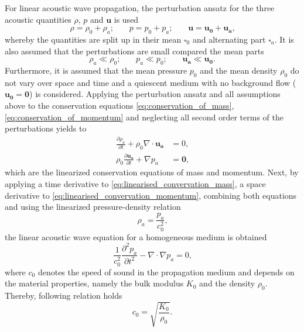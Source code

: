 For linear acoustic wave propagation, the perturbation ansatz for the three acoustic quantities $\rho$, $p$ and $\boldsymbol{u}$ is used
\begin{equation}
	\rho = \rho_0 + \rho_a\text{;}\qquad p = p_0 + p_a\text{;}\qquad \boldsymbol{u} = \boldsymbol{u_0} + \boldsymbol{u_a}\text{,}
\end{equation}
whereby the quantities are split up in their mean $\square_0$ and alternating part $\square_a$. It is also assumed that the perturbations are small compared the mean parts
\begin{equation}
	\rho_a \ll \rho_0\text{;}\qquad p_a \ll p_0\text{;}\qquad \boldsymbol{u_a} \ll \boldsymbol{u_0}\text{.}
\end{equation}
Furthermore, it is assumed that the mean pressure $p_0$ and the mean density $\rho_0$ do not vary over space and time and a quiescent medium with no background flow ($\boldsymbol{u_0} = \boldsymbol{0}$) is considered. Applying the perturbation ansatz and all assumptions above to the conservation equations \cref{eq:conservation_of_mass}, \cref{eq:conservation_of_momentum} and neglecting all second order terms of the perturbations yields to
\begin{align}
	\frac{\partial \rho_a}{\partial t} + \rho_0\nabla\cdot\boldsymbol{u_a} &= 0\text{,} \label{eq:linearised_convervation_mass} \\ 
	\rho_0\frac{\partial \boldsymbol{u_a}}{\partial t} + \nabla p_a &= \boldsymbol{0}\text{,} \label{eq:linearised_convervation_momentum}
\end{align}
which are the linearized conservation equations of mass and momentum. Next, by applying a time derivative to \cref{eq:linearised_convervation_mass}, a space derivative to \cref{eq:linearised_convervation_momentum}, combining both equations and using the linearized pressure-density relation
\begin{equation}
	\rho_a = \frac{p_a}{c_0^2}\text{,}
\end{equation}
the linear acoustic wave equation for a homogeneous medium is obtained
\begin{equation}
	\frac{1}{c_0^2}\frac{\partial^2 p_a}{\partial t^2} - \nabla\cdot\nabla p_a = 0\text{,} \label{eq:wave_equation}
\end{equation}
where $c_0$ denotes the speed of sound in the propagation medium and depends on the material properties, namely the bulk modulus $K_0$ and the density $\rho_0$. Thereby, following relation holds \cite{fahy_foundations_2001, kinsler_fundamentals_2000}
\begin{equation}
	c_0 = \sqrt{\frac{K_0}{\rho_0}}\text{.}
\end{equation}

